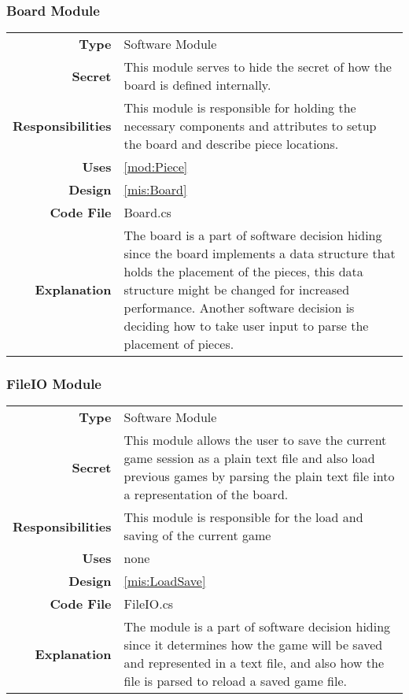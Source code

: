 \documentclass[10pt]{article}
\makeatletter
\newcommand{\CustomLabel}[1]{\Hy@raisedlink{\hypertarget{#1}{}}\label{#1}}
\makeatother
\begin{document}
    \subsubsection{Board Module}\CustomLabel{mod:Board}
        \begin{tabularx}{\linewidth}{ >{\bfseries}r X }
            Type            & Software Module \\
            Secret          & This module serves to hide the secret of how the board is defined internally. \\
            Responsibilities & This module is responsible for holding the necessary components and attributes to setup the board and describe piece locations. \\
            Uses            & \ref{mod:Piece} \\
            Design          & \ref{mis:Board} \\
            Code File       & Board.cs \\
            Explanation     & The board is a part of software decision hiding since the board implements a data structure that holds the placement of the pieces, this data structure might be changed for increased performance. Another software decision is deciding how to take user input to parse the placement of pieces. \\
        \end{tabularx}

   
    \subsubsection{FileIO Module}\CustomLabel{mod:LoadSave}
        \begin{tabularx}{\linewidth}{ >{\bfseries}r X }
            Type            & Software Module \\
            Secret          & This module allows the user to save the current game session as a plain text file and also load previous games by parsing the plain text file into a representation of the board. \\
            Responsibilities & This module is responsible for the load and saving of the current game  \\
            Uses            & none \\
            Design          & \ref{mis:LoadSave} \\
            Code File       & FileIO.cs \\
            Explanation     & The module is a part of software decision hiding since it determines how the game will be saved and represented in a text file, and also how the file is parsed to reload a saved game file. \\
        \end{tabularx}  
        
\end{document}
